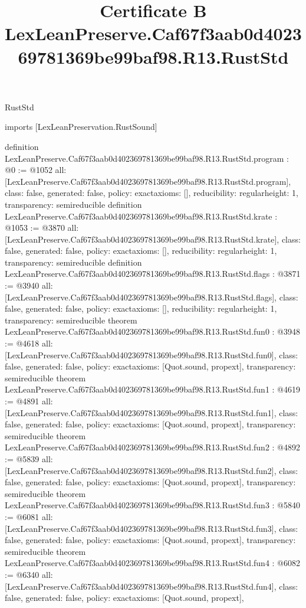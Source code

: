 \begin{lexlean}{RustStd}
\title{Certificate B LexLeanPreserve.Caf67f3aab0d402369781369be99baf98.R13.RustStd}
\begin{coremodule}
imports [LexLeanPreservation.RustSound]

definition LexLeanPreserve.Caf67f3aab0d402369781369be99baf98.R13.RustStd.program : @0 := @1052 {
  all: [LexLeanPreserve.Caf67f3aab0d402369781369be99baf98.R13.RustStd.program],
  class: false,
  generated: false,
  policy: exact{axioms: []},
  reducibility: regular{height: 1},
  transparency: semireducible
}
definition LexLeanPreserve.Caf67f3aab0d402369781369be99baf98.R13.RustStd.krate : @1053 := @3870 {
  all: [LexLeanPreserve.Caf67f3aab0d402369781369be99baf98.R13.RustStd.krate],
  class: false,
  generated: false,
  policy: exact{axioms: []},
  reducibility: regular{height: 1},
  transparency: semireducible
}
definition LexLeanPreserve.Caf67f3aab0d402369781369be99baf98.R13.RustStd.flags : @3871 := @3940 {
  all: [LexLeanPreserve.Caf67f3aab0d402369781369be99baf98.R13.RustStd.flags],
  class: false,
  generated: false,
  policy: exact{axioms: []},
  reducibility: regular{height: 1},
  transparency: semireducible
}
theorem LexLeanPreserve.Caf67f3aab0d402369781369be99baf98.R13.RustStd.fun0 : @3948 := @4618 {
  all: [LexLeanPreserve.Caf67f3aab0d402369781369be99baf98.R13.RustStd.fun0],
  class: false,
  generated: false,
  policy: exact{axioms: [Quot.sound, propext]},
  transparency: semireducible
}
theorem LexLeanPreserve.Caf67f3aab0d402369781369be99baf98.R13.RustStd.fun1 : @4619 := @4891 {
  all: [LexLeanPreserve.Caf67f3aab0d402369781369be99baf98.R13.RustStd.fun1],
  class: false,
  generated: false,
  policy: exact{axioms: [Quot.sound, propext]},
  transparency: semireducible
}
theorem LexLeanPreserve.Caf67f3aab0d402369781369be99baf98.R13.RustStd.fun2 : @4892 := @5839 {
  all: [LexLeanPreserve.Caf67f3aab0d402369781369be99baf98.R13.RustStd.fun2],
  class: false,
  generated: false,
  policy: exact{axioms: [Quot.sound, propext]},
  transparency: semireducible
}
theorem LexLeanPreserve.Caf67f3aab0d402369781369be99baf98.R13.RustStd.fun3 : @5840 := @6081 {
  all: [LexLeanPreserve.Caf67f3aab0d402369781369be99baf98.R13.RustStd.fun3],
  class: false,
  generated: false,
  policy: exact{axioms: [Quot.sound, propext]},
  transparency: semireducible
}
theorem LexLeanPreserve.Caf67f3aab0d402369781369be99baf98.R13.RustStd.fun4 : @6082 := @6340 {
  all: [LexLeanPreserve.Caf67f3aab0d402369781369be99baf98.R13.RustStd.fun4],
  class: false,
  generated: false,
  policy: exact{axioms: [Quot.sound, propext]},
}
\end{coremodule}
\end{lexlean}
